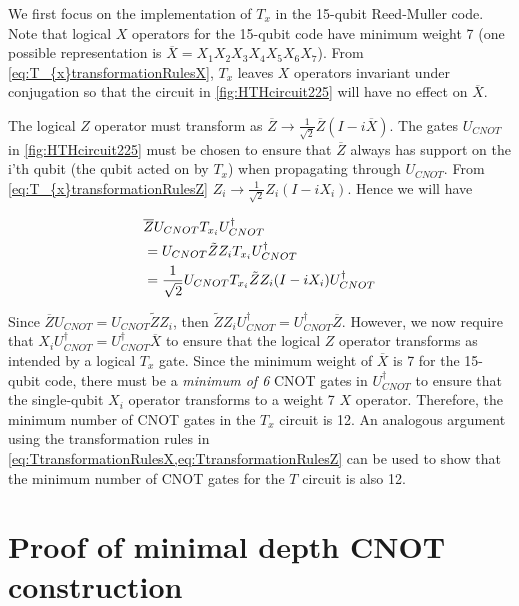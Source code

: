 \documentclass[pra,longbibliography,twocolumn,showpacs,nofootinbib,superscriptaddress,notitlepage]{revtex4-1}
\begin{document}
We first focus on the implementation of $T_{x}$ in the 15-qubit Reed-Muller code. Note that logical $X$ operators for the 15-qubit code have minimum weight 7 \cite{ADP14} (one possible representation is $\overline{X} = X_{1}X_{2}X_{3}X_{4}X_{5}X_{6}X_{7}$). From \cref{eq:T_{x}transformationRulesX}, $T_{x}$ leaves $X$ operators invariant under conjugation so that the circuit in \cref{fig:HTHcircuit225} will have no effect on $\overline{X}$. 

The logical $Z$ operator must transform as $\overline{Z} \to \frac{1}{\sqrt{2}}\overline{Z}(I-i\overline{X})$. The gates $U_{CNOT}$ in \cref{fig:HTHcircuit225} must be chosen to ensure that $\overline{Z}$ always has support on the i'th qubit (the qubit acted on by $T_{x}$) when propagating through $U_{CNOT}$. From \cref{eq:T_{x}transformationRulesZ} $Z_{i} \to \frac{1}{\sqrt{2}}Z_{i}(I-iX_{i})$. Hence we will have

\begin{align}
 &\overline{Z}U_{CNOT}T_{x_{i}}U_{CNOT}^{\dagger} \nonumber \\
 &= U_{CNOT}\tilde{Z}Z_{i}T_{x_{i}}U_{CNOT}^{\dagger}  \nonumber \\
 &= \frac{1}{\sqrt{2}}U_{CNOT}T_{x_{i}}\tilde{Z}Z_{i}(I-iX_{i})U_{CNOT}^{\dagger}
 \label{eq:T_{x}transformZbar}
 \end{align}

Since $\overline{Z}U_{CNOT} = U_{CNOT} \tilde{Z}Z_{i}$, then $\tilde{Z}Z_{i}U_{CNOT}^{\dagger} = U_{CNOT}^{\dagger}\overline{Z}$. However, we now require that $X_{i}U_{CNOT}^{\dagger} = U_{CNOT}^{\dagger}\overline{X}$ to ensure that the logical $Z$ operator transforms as intended by a logical $T_{x}$ gate. Since the minimum weight of $\overline{X}$ is 7 for the 15-qubit code, there must be a \textit{minimum of 6} CNOT gates in $U_{CNOT}^{\dagger}$ to ensure that the single-qubit $X_{i}$ operator transforms to a weight 7 $X$ operator. Therefore, the minimum number of CNOT gates in the $T_{x}$ circuit is 12. An analogous argument using the transformation rules in \cref{eq:TtransformationRulesX,eq:TtransformationRulesZ} can be used to show that the minimum number of CNOT gates for the $T$ circuit is also 12. 


\section{Proof of minimal depth CNOT construction}
\label{app:MinCNOTDepth}
\end{document}
